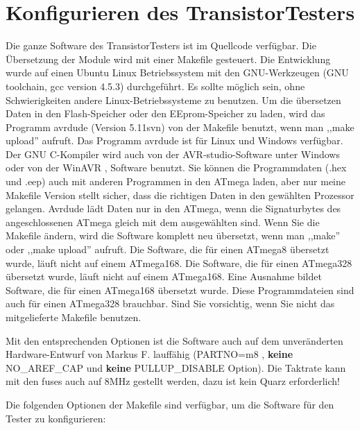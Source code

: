 \chapter{Konfigurieren des TransistorTesters}
\label{sec:config}
Die ganze Software des TransistorTesters ist im Quellcode verfügbar.
Die Übersetzung der Module wird mit einer Makefile gesteuert. Die Entwicklung wurde
auf einen Ubuntu Linux Betriebssystem mit den GNU-Werkzeugen (GNU toolchain, gcc version 4.5.3) durchgeführt.
Es sollte möglich sein, ohne Schwierigkeiten andere Linux-Betriebssysteme zu benutzen.
Um die übersetzen Daten in den Flash-Speicher oder den EEprom-Speicher zu laden, wird das
Programm avrdude \cite{avrdude} (Version 5.11svn) von der Makefile benutzt, wenn man ,,make upload'' aufruft.
Das Programm avrdude ist für Linux und Windows verfügbar.
Der GNU C-Kompiler wird auch von der AVR-studio-Software unter Windows oder von
der WinAVR \cite{winavr1},\cite{winavr2} Software benutzt.
Sie können die Programmdaten (.hex und .eep) auch mit anderen Programmen in den ATmega laden,
aber nur meine Makefile Version stellt sicher, dass die richtigen Daten in den gewählten Prozessor gelangen.
Avrdude lädt Daten nur in den ATmega, wenn die Signaturbytes des angeschlossenen ATmega gleich mit dem ausgewählten sind.
Wenn Sie die Makefile ändern, wird die Software komplett neu übersetzt, wenn man ,,make'' oder
,,make upload'' aufruft.
Die Software, die für einen ATmega8 übersetzt wurde, läuft nicht auf einem ATmega168.
Die Software, die für einen ATmega328 übersetzt wurde, läuft nicht auf einem ATmega168.
Eine Ausnahme bildet Software, die für einen ATmega168 übersetzt wurde. Diese Programmdateien
sind auch für einen ATmega328 brauchbar.
Sind Sie vorsichtig, wenn Sie nicht das mitgelieferte Makefile benutzen.

Mit den entsprechenden Optionen ist die Software auch auf dem unveränderten Hardware-Entwurf von
Markus F. lauffähig (PARTNO=m8 , {\bf keine} NO\_AREF\_CAP und {\bf keine} PULLUP\_DISABLE Option).
Die Taktrate kann mit den fuses auch auf 8MHz gestellt werden, dazu ist kein Quarz erforderlich!


Die folgenden Optionen der Makefile sind verfügbar, um die Software für den Tester zu konfigurieren:

